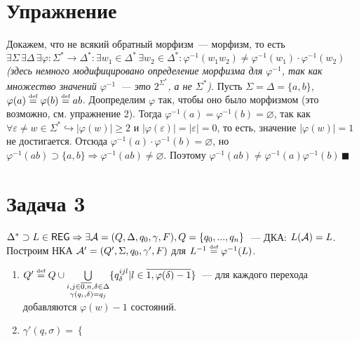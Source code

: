 \documentclass[a4paper]{article}
\def\A{{\cal A}}
\def\REG{{\mathsf{REG}}}
\begin{document}
\begin{enumerate}[1.]
\section*{Упражнение}
Докажем, что не всякий обратный морфизм~--- морфизм, то есть $\exists\Sigma\,\exists\Delta\,\exists\varphi\colon\Sigma^*\longrightarrow\Delta^*\colon\exists w_1\in\Delta^*\,\exists w_2\in\Delta^*\colon \varphi^{-1}(w_1w_2)\neq\varphi^{-1}(w_1)\cdot\varphi^{-1}(w_2)$ {\em (здесь немного модифицировано определение морфизма для $\varphi^{-1}$, так как множество значений $\varphi^{-1}$~--- это $2^{\Sigma^*}$, а не $\Sigma^*$)}.\newline
Пусть $\Sigma=\Delta=\{a,b\}$, $\varphi(a)\overset{\mbox{\tiny def}}{=}\varphi(b)\overset{\mbox{\tiny def}}{=}ab$. Доопределим $\varphi$ так, чтобы оно было морфизмом (это возможно, см. упражнение 2). Тогда $\varphi^{-1}(a)=\varphi^{-1}(b)=\varnothing$, так как $\forall \varepsilon\neq w\in\Sigma^*\hookrightarrow|\varphi(w)|\geqslant 2$ и $|\varphi(\varepsilon)|=|\varepsilon|=0$, то есть, значение $|\varphi(w)|=1$ не достигается. Отсюда $\varphi^{-1}(a)\cdot\varphi^{-1}(b)=\varnothing$, но $\varphi^{-1}(ab)\supset\{a,b\}\Rightarrow\varphi^{-1}(ab)\neq\varnothing$. Поэтому $\varphi^{-1}(ab)\neq\varphi^{-1}(a)\varphi^{-1}(b)\,\blacksquare$
\section*{Задача 3}
$\Delta^*\supset L\in\REG\Rightarrow\exists\A=(Q,\Delta,q_0,\gamma,F),Q=\{q_0,...,q_n\}$~--- ДКА: $L(\A)=L$. Построим НКА $\A'=(Q',\Sigma,q_0,\gamma',F)$ для $L^{-1}\overset{\mbox{\tiny def}}{=}\varphi^{-1}(L)$.
\begin{enumerate}
\item $Q'\overset{\mbox{\tiny def}}{=}Q\cup\bigcup\limits_{\substack{i,j\in\overline{0,n},\delta\in\Delta\\\gamma(q_i,\delta)=q_j}}\{q^{ijl}_{\delta}|l\in\overline{1,\varphi(\delta)-1}\}$~--- для каждого перехода добавляются $\varphi(w)-1$ состояний.
\item $\gamma'(q,\sigma)=\begin{cases}

\end{cases}$
\end{enumerate}

\end{enumerate}
\end{document}
